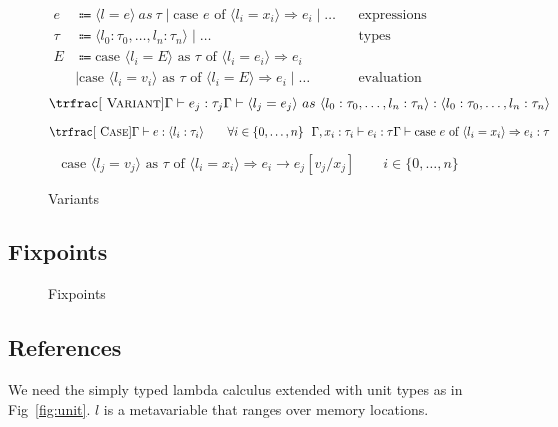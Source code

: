 \documentclass[nonacm]{acmart}
\newcommand{\caseof}[3]{\text{case } \langle#1 \rangle\text{ as } \tau\text{ of } \langle#2\rangle\Rightarrow#3}
\begin{document}
\begin{figure}
  \begin{framed}
    \begin{align*}
      e & \Coloneqq \langle l = e \rangle~as~\tau \mid \text{case } e \text{ of } \langle l_i = x_i \rangle \Rightarrow e_i \mid \dots && \text{expressions} \\
      \tau & \Coloneqq \langle l_0 : \tau_0, \dots, l_n : \tau_n \rangle \mid \dots && \text{types} \\
      E & \Coloneqq \text{case } \langle l_i = E \rangle \text{ as } \tau \text{ of } \langle l_i = e_i \rangle \Rightarrow e_i \\
      &\mid \caseof{l_i = v_i}{l_i = E}{e_i}
      \mid \dots && \text{evaluation contexts}
    \end{align*}
    \[
      \trfrac[~\textsc{Variant}]{\Gamma \vdash e_j : \tau_j}{
        \Gamma \vdash \langle l_j = e_j \rangle~as~\langle l_0 : \tau_0, \dots, l_n : \tau_n \rangle : \langle l_0 : \tau_0, \dots, l_n : \tau_n \rangle
      }
    \]

    \[
    \trfrac[~\textsc{Case}]{\Gamma \vdash e : \langle l_i : \tau_i \rangle \qquad \forall i \in \{0,\dots,n\}~~\Gamma, x_i : \tau_i \vdash e_i : \tau}{\Gamma \vdash \text{case } e \text{ of } \langle l_i = x_i \rangle \Rightarrow e_i : \tau}
    \]

    \[
      \caseof{ l_j = v_j}{l_i = x_i}{e_i} \rightarrow e_j[v_j/x_j] \qquad i \in \{0, \dots, n\}
    \]
  \end{framed}
  \caption{Variants}\label{fig:variants}
\end{figure}

\subsection{Fixpoints}

\begin{figure}
  \begin{framed}
  \end{framed}
  \caption{Fixpoints}\label{fig:fixpoints}
\end{figure}

\subsection{References}

We need the simply typed lambda calculus extended with unit types as in Fig~\ref{fig:unit}.
\(l\) is a metavariable that ranges over memory locations.
\end{document}
